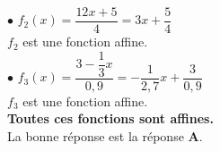 \documentclass[a4paper,11pt]{article}
\begin{document}
\begin{seance}{}
\begin{enumerate}
         $\bullet$ $f_2(x)=\dfrac{12x+5}{4}=3x+\dfrac{5}{4}$\\
        $f_2$ est une fonction affine.\\        $\bullet$ $f_3(x)=\dfrac{3-\dfrac{1}{3}x}{0{,}9}=-\dfrac{1}{2{,}7}x+\dfrac{3}{0{,}9}$\\
        $f_3$ est une fonction affine.\\
{\bfseries \color[HTML]{F15929}Toutes ces fonctions sont affines.}\\La bonne réponse est la réponse {\bfseries \color[HTML]{F15929}A}.

\end{enumerate}

\end{seance}
\end{document}
